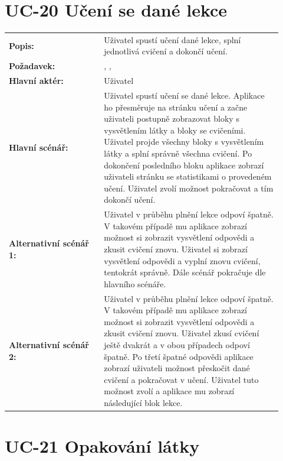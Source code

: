 \section{UC-20 Učení se dané lekce}\label{sec:uc-20}

\begin{tabular}{p{0.32\linewidth}p{0.6\linewidth}}
  \textbf{Popis:} & Uživatel spustí učení dané lekce, splní jednotlivá cvičení a dokončí učení. \\
  \textbf{Požadavek:} & \nameref{sec:fp-learning-structure}, \nameref{sec:fp-exercise-blocks}, \nameref{sec:fp-explanation-blocks} \\
  \textbf{Hlavní aktér:} & Uživatel \\
  \textbf{Hlavní scénář:} & Uživatel spustí učení se dané lekce. Aplikace ho přesměruje na stránku učení a začne uživateli postupně zobrazovat bloky s vysvětlením látky a bloky se cvičeními. Uživatel projde všechny bloky s vysvětlením látky a splní správně všechna cvičení. Po dokončení posledního bloku aplikace zobrazí uživateli stránku se statistikami o provedeném učení. Uživatel zvolí možnost pokračovat a tím dokončí učení. \\
  \textbf{Alternativní scénář 1:} & Uživatel v průběhu plnění lekce odpoví špatně. V takovém případě mu aplikace zobrazí možnost si zobrazit vysvětlení odpovědi a zkusit cvičení znovu. Uživatel si zobrazí vysvětlení odpovědi a vyplní znovu cvičení, tentokrát správně. Dále scénář pokračuje dle hlavního scénáře. \\
  \textbf{Alternativní scénář 2:} & Uživatel v průběhu plnění lekce odpoví špatně. V takovém případě mu aplikace zobrazí možnost si zobrazit vysvětlení odpovědi a zkusit cvičení znovu. Uživatel zkusí cvičení ještě dvakrát a v obou případech odpoví špatně. Po třetí špatné odpovědi aplikace zobrazí uživateli možnost přeskočit dané cvičení a pokračovat v učení. Uživatel tuto možnost zvolí a aplikace mu zobrazí následující blok lekce. \\
\end{tabular}

\section{UC-21 Opakování látky}\label{sec:uc-21}

